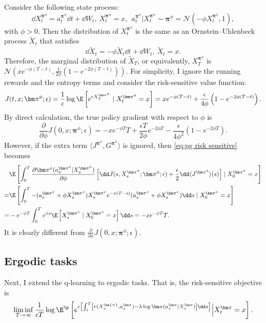 \begin{eg}
	\label{eg:pg}
	Consider the following state process:
	\[ \dd X_t^{\bm\pi^{\phi}} = a_t^{\bm\pi^{\phi}}\dd t + \dd W_t,\ X_t^{\bm\pi^{\phi}} = x,\  \ a_t^{\bm\pi^{\phi}}|X_t^{\bm\pi^{\phi}} \sim \bm\pi^{\phi} = \mathcal{N}(-\phi X_t^{\bm\pi^{\phi}},1) , \]
	with $\phi > 0$. Then the distribution of $X_t^{\bm\pi^{\phi}}$ is the same as an Ornstein–Uhlenbeck process $\tilde X_t$ that satisfies 
	\[  \dd \tilde X_t = -\phi \tilde X_t\dd t + \dd W_t,\ \tilde X_t = x .\]
	Therefore, the marginal distribution of $\tilde X_T$, or equivalently, $X^{\bm\pi^{\phi}}_T$ is $\mathcal N\left(x e^{-\phi(T-t)}, \frac{1}{2\phi}\left(1 - e^{-2\phi(T-t)}\right)  \right)$. For simplicity, I ignore the running rewards and the entropy terms and consider the risk-sensitive value function:
	\[ J(t,x;\bm\pi^{\phi};\epsilon) = \frac{1}{\epsilon}\log\E\left[ e^{\epsilon X_T^{\bm\pi^{\phi}}}  \mid X_t^{\bm\pi^{\phi}} = x\right] = xe^{-\phi(T-t)} + \frac{\epsilon}{4\phi}\left(1 -  e^{-2\phi(T-t)} \right) . \]
	By direct calculation, the true policy gradient with respect to $\phi$ is
	\[ \frac{\partial }{\partial \phi} J(0,x;\bm\pi^{\phi};\epsilon) = -x e^{-\phi T}T + \frac{\epsilon T}{2\phi}e^{-2\phi T} - \frac{\epsilon}{4\phi^2}(1 - e^{-2\phi T}) . \]
	However, if the extra term $\langle J^{\bm\pi^{\phi}}, G^{\bm\pi^{\phi}} \rangle$ is ignored, then \eqref{eq:pg risk sensitive} becomes
	\[\begin{aligned}
		& \E\left[\int_0^T \frac{\partial \bm\pi^{\phi}(a_s^{\bm\pi^{\phi}} | X_s^{\bm\pi^{\phi}}) }{\partial \phi} \left[\dd J(s,X_s^{\bm\pi^{\phi}};\bm\pi^{\phi};\epsilon) + \frac{\epsilon}{2}\dd \langle J^{\bm\pi^{\phi}} \rangle(s)   \right]  \mid X_0^{\bm\pi^{\phi}} = x  \right]\\
		= & \E\left[\int_0^T -(a_s^{\bm\pi^{\phi}} +\phi X_s^{\bm\pi^{\phi}}) X_s^{\bm\pi^{\phi}} e^{-\phi(T-s)}(a_s^{\bm\pi^{\phi}} +\phi X_s^{\bm\pi^{\phi}})\dd s   \mid X_0^{\bm\pi^{\phi}} = x \right] \\
		= & -e^{-\phi T}\int_0^T e^{\phi s}  \E\left[ X_s^{\bm\pi^{\phi}}  \mid X_0^{\bm\pi^{\phi}} = x \right]\dd s = -xe^{-\phi T} T . 
	\end{aligned}  \]
	It is clearly different from $\frac{\partial }{\partial \phi} J(0,x;\bm\pi^{\phi};\epsilon)$.
\end{eg}

\subsection{Ergodic tasks}
\label{subsec:ergodic}
Next, I extend the q-learning to ergodic tasks. That is, the risk-sensitive objective is 
\[ \liminf_{T\to \infty} \frac{1}{\epsilon T}\log\E^{\p}\left[e^{\epsilon \left[ \int_t^T \left[ r(X_s^{\bm{\pi}},a_s^{\bm \pi}) - \lambda \log\bm\pi(a_s^{\bm\pi}|X_s^{\bm\pi}) \right] \dd s \right]} \Big|X_t^{\bm \pi}= x\right] . \]

